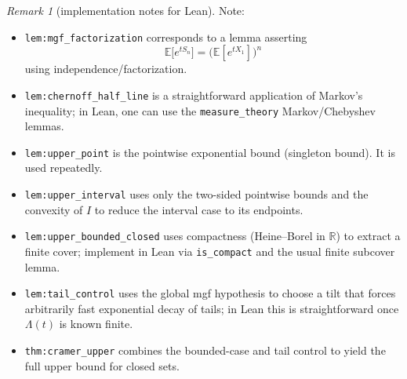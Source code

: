 \documentclass[12pt]{article}
\theoremstyle{definition}
\theoremstyle{remark}
\newtheorem*{remark}{Remark}
\begin{document}
\begin{remark}[implementation notes for Lean] Note:

\begin{itemize}
\item \texttt{lem:mgf\_factorization} corresponds to a lemma asserting
\[
\mathbb{E}\big[e^{t S_n}\big] = \big(\mathbb{E}[e^{t X_1}]\big)^n
\]
using independence/factorization.
\item \texttt{lem:chernoff\_half\_line} is a straightforward application of Markov's
inequality; in Lean, one can use the \texttt{measure\_theory} Markov/Chebyshev lemmas.
\item \texttt{lem:upper\_point} is the pointwise exponential bound (singleton bound).
It is used repeatedly.
\item \texttt{lem:upper\_interval} uses only the two-sided pointwise bounds and the
convexity of \(I\) to reduce the interval case to its endpoints.
\item \texttt{lem:upper\_bounded\_closed} uses compactness (Heine--Borel in \(\mathbb{R}\))
to extract a finite cover; implement in Lean via \texttt{is\_compact} and the usual finite
subcover lemma.
\item \texttt{lem:tail\_control} uses the global mgf hypothesis to choose a tilt that
forces arbitrarily fast exponential decay of tails; in Lean this is straightforward once
\(\Lambda(t)\) is known finite.
\item \texttt{thm:cramer\_upper} combines the bounded-case and tail control to yield the
full upper bound for closed sets.
\end{itemize}
\end{remark}
\end{document}
